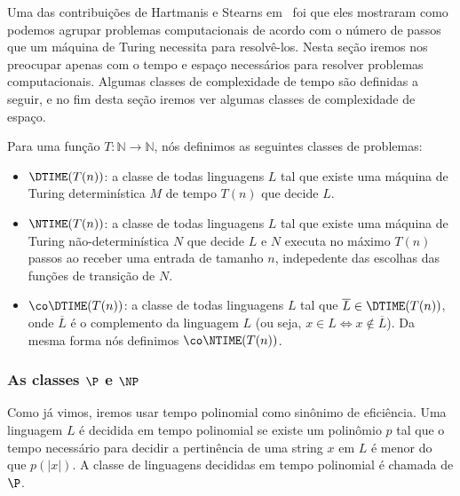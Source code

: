 Uma das contribuições de Hartmanis e Stearns em~\cite{hartmanis1965computational} foi que eles mostraram como podemos agrupar problemas computacionais de acordo com o número de passos que um máquina de Turing necessita para resolvê-los. Nesta seção iremos nos preocupar apenas com o tempo e espaço necessários para resolver problemas computacionais. Algumas classes de complexidade de tempo são definidas a seguir, e no fim desta seção iremos ver algumas classes de complexidade de espaço.

\begin{defi}

Para uma função $T: \mathbb{N} \to \mathbb{N}$, nós definimos as seguintes classes de problemas:

\begin{itemize}

\item $\text{\DTIME}(T(n))$: a classe de todas linguagens $L$ tal que existe uma máquina de Turing determinística $M$ de tempo $T(n)$ que decide $L$.

\item $\text{\NTIME}(T(n))$: a classe de todas linguagens $L$ tal que existe uma máquina de Turing não-determinística $N$ que decide $L$ e $N$ executa no máximo $T(n)$ passos ao receber uma entrada de tamanho $n$, indepedente das escolhas das funções de transição de $N$.

\item $\text{\co\DTIME}(T(n))$: a classe de todas linguagens $L$ tal que $\overline{L} \in \text{\DTIME}(T(n))$, onde $\overline{L}$ é o complemento da linguagem $L$ (ou seja, $x \in L \iff x \notin \overline{L}$). Da mesma forma nós definimos $\text{\co\NTIME}(T(n))$.

\end{itemize}

\end{defi}


\subsubsection{As classes $\P$ e $\NP$}


Como já vimos, iremos usar tempo polinomial como sinônimo de eficiência. Uma linguagem $L$ é decidida em tempo polinomial se existe um polinômio $p$ tal que o tempo necessário para decidir a pertinência de uma string $x$ em $L$ é menor do que $p(\lvert x \rvert)$. A classe de linguagens decididas em tempo polinomial é chamada de $\P$.

